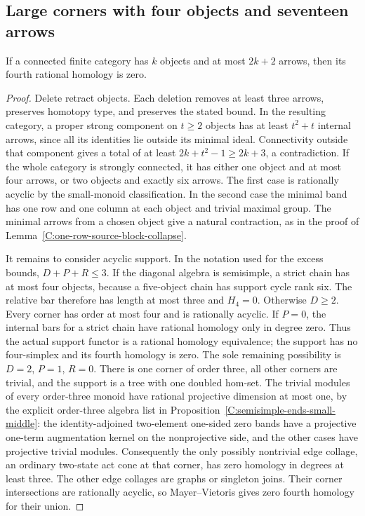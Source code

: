 \subsection{Large corners with four objects and seventeen arrows}

\begin{lemma}
\label{C:arrow-excess-three-H4}
If a connected finite category has $k$ objects and at most
$2k+2$ arrows, then its fourth rational homology is zero.
\end{lemma}
\begin{proof}
Delete retract objects. Each deletion removes at least three
arrows, preserves homotopy type, and preserves the stated bound.
In the resulting category, a proper strong component on $t\geq2$
objects has at least $t^2+t$ internal arrows, since all its
identities lie outside its minimal ideal. Connectivity outside
that component gives a total of at least
$2k+t^2-1\geq2k+3$, a contradiction. If the whole category is
strongly connected, it has either one object and at most four
arrows, or two objects and exactly six arrows. The first case
is rationally acyclic by the small-monoid classification.
In the second case the minimal band has one row and one column
at each object and trivial maximal group. The minimal arrows
from a chosen object give a natural contraction, as in the
proof of Lemma~\ref{C:one-row-source-block-collapse}.

It remains to consider acyclic support. In the notation used
for the excess bounds, $D+P+R\leq3$. If the diagonal algebra
is semisimple, a strict chain has at most four objects, because
a five-object chain has support cycle rank six. The relative
bar therefore has length at most three and $H_4=0$.
Otherwise $D\geq2$. Every corner has order at most four and
is rationally acyclic. If $P=0$, the internal bars for a strict
chain have rational homology only in degree zero. Thus the
actual support functor is a rational homology equivalence;
the support has no four-simplex and its fourth homology is zero.
The sole remaining possibility is $D=2$, $P=1$, $R=0$.
There is one corner of order three, all other corners are
trivial, and the support is a tree with one doubled hom-set.
The trivial modules of every order-three monoid have rational
projective dimension at most one, by the explicit order-three
algebra list in Proposition~\ref{C:semisimple-ends-small-middle}:
the identity-adjoined two-element one-sided zero bands have
a projective one-term augmentation kernel on the nonprojective
side, and the other cases have projective trivial modules.
Consequently the only
possibly nontrivial edge collage, an ordinary two-state act
cone at that corner, has zero homology in degrees at least
three. The other edge collages are graphs or singleton joins.
Their corner intersections are rationally acyclic, so
Mayer--Vietoris gives zero fourth homology for their union.
\end{proof}

